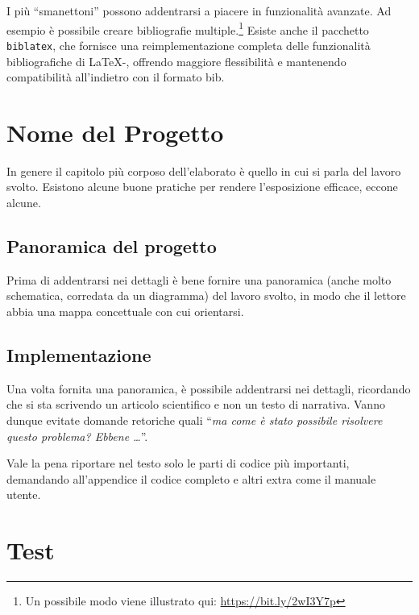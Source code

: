 \documentclass[12pt,italian]{report}
\begin{document}
I pi\`u ``smanettoni'' possono addentrarsi a piacere in funzionalit\`a avanzate. Ad esempio \`e possibile creare bibliografie multiple.\footnote{Un possibile modo viene illustrato qui: \url{https://bit.ly/2wI3Y7p}}
Esiste anche il pacchetto \texttt{biblatex}, che fornisce una reimplementazione completa delle funzionalit\`a bibliografiche di \LaTeX-, offrendo maggiore flessibilit\`a e mantenendo compatibilit\`a all'indietro con il formato bib.





% 
% 

\chapter{Nome del Progetto}
\label{cap4}

In genere il capitolo più corposo dell'elaborato è quello in cui si parla del lavoro svolto. Esistono alcune buone pratiche per rendere l'esposizione efficace, eccone alcune.

\section{Panoramica del progetto}

Prima di addentrarsi nei dettagli è bene fornire una panoramica (anche molto schematica, corredata da un diagramma) del lavoro svolto, in modo che il lettore abbia una mappa concettuale con cui orientarsi.

\section{Implementazione}

Una volta fornita una panoramica, è possibile addentrarsi nei dettagli, ricordando che si sta scrivendo un articolo scientifico e non un testo di narrativa. Vanno dunque evitate domande retoriche quali ``\textit{ma come è stato possibile risolvere questo problema? Ebbene \ldots}''.

Vale la pena riportare nel testo solo le parti di codice più importanti, demandando all'appendice il codice completo e altri extra come il manuale utente.

% 
% 

\chapter{Test}
\label{cap5}
\end{document}

